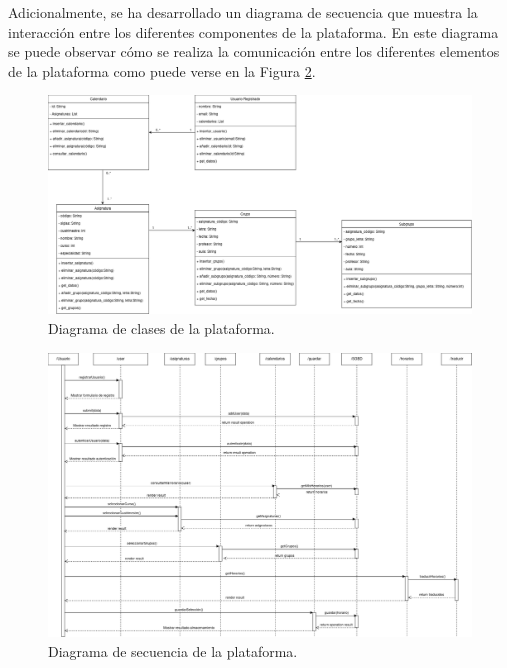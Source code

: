 Adicionalmente, se ha desarrollado un diagrama de secuencia que muestra la interacción entre los diferentes componentes de la plataforma. En este diagrama se puede observar cómo se realiza la comunicación entre los diferentes elementos de la plataforma como puede verse en la Figura \ref{fig:sequence_diagram}.\newline

\newpage

\begin{landscape}
    \begin{figure}[H]
        \centering
        \includegraphics[width=1.6\textwidth]{./imagenes/Class_Diagram.png}
        \caption{Diagrama de clases de la plataforma.}
        \label{fig:class_diagram}
    \end{figure}  
\end{landscape}

\begin{landscape}
    \begin{figure}[H]
        \centering
        \includegraphics[width=1.35\textwidth]{./imagenes/Secuencia_Diagrama.png}
        \caption{Diagrama de secuencia de la plataforma.}
        \label{fig:sequence_diagram}
    \end{figure}    
\end{landscape}


